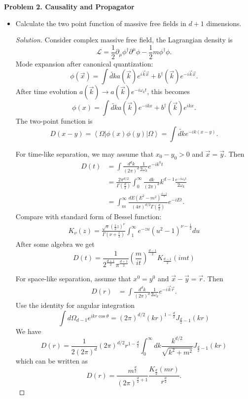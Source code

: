 \textbf{Problem 2. Causality and Propagator}
\begin{itemize}
	\item Calculate the two point function of massive free fields in $d+1$ dimensions.

\begin{proof}[Solution]
	Consider complex massive free field, the Lagrangian density is
	\[
		\mathcal{L} = \frac{1}{2} \partial_ \mu \phi ^\dag \partial^ \mu \phi - \frac{1}{2} m \phi^\dag \phi
	.\] 
	Mode expansion after canonical quantization:
	\[
		\phi(\vec{x} ) = \int \tilde{dk} a(\vec{k} ) e^{i \vec{k}  \vec{x} } + b^{\dag} (\vec{k} ) e^{- i \vec{k} \vec{x} }
	.\] 
	After time evolution $a(\vec{k} ) \to a(\vec{k} ) e^{- i \omega_k t}$, this becomes
	\[
		\phi(x) = \int \tilde{dk} a(\vec{k} ) e^{- i k x} + b^{\dag} (\vec{k} ) e^{i k x}
	.\] 
	The two-point function is
	\[
		D(x - y) = \left\langle \Omega \right| \phi(x) \phi(y) \left| \Omega \right\rangle = \int \tilde{dk} e^{- i k(x - y)}
	.\] 

	For time-like separation, we may assume that $x_0 - y_0 > 0$ and $\vec{x}  = \vec{y} $. Then
	\begin{align*}
		D(t)
		&= \int \frac{d^d k}{(2 \pi)^d} \frac{1}{2 \omega_k} e^{- i k^0 t} \\
		&= \frac{2 \pi^{d / 2}}{\Gamma(\frac{d}{2})} \int_0^\infty  \frac{d k}{(2 \pi)^d} k^{d - 1} \frac{e^{- i \omega_k t}}{2 \omega_k} \\
		&= \int _m^\infty \frac{dE (E^2 - m^2)^{\frac{d - 2}{2}}}{(4 \pi)^{d / 2} \Gamma(\frac{d}{2})} e^{- i E t}
	.\end{align*}
	Compare with standard form of Bessel function:
	\begin{align*}
K_\nu(z)=\frac{\sqrt{\pi}\left(\frac{1}{2} z\right)^\nu}{\Gamma\left(\nu+\frac{1}{2}\right)} \int_1^{\infty} e^{-z u}\left(u^2-1\right)^{\nu-\frac{1}{2}} d u
\end{align*}
After some algebra we get
\[
D(t)=\frac{1}{2^{\frac{d+1}{2}} \pi^{\frac{d+1}{2}}}\left(\frac{m}{i t}\right)^{\frac{d-1}{2}} K_{\frac{d-1}{2}}(i m t)
\]

For space-like separation, assume that $x^0 = y^0 $ and  $\vec{x}  - \vec{y} = \vec{r} $. Then
\begin{align*}
	D(r) &= \int \frac{d^d k}{(2 \pi)^d} \frac{1}{2 \omega_k}e^{- i \vec{k} \vec{r} }
.\end{align*}
Use the identity for angular integration
\[
\int d \Omega_{d-1} e^{i k r \cos \theta}=(2 \pi)^{d / 2}(k r)^{1-\frac{d}{2}} J_{\frac{d}{2}-1}(k r)
\]
We have
\[
D(r)=\frac{1}{2(2 \pi)^d}(2 \pi)^{d / 2} r^{1-\frac{d}{2}} \int_0^{\infty} d k \frac{k^{d / 2}}{\sqrt{k^2+m^2}} J_{\frac{d}{2}-1}(k r)
\]
which can be written as
\[
	D(r) = \frac{m^{\frac{d}{2}}}{(2 \pi)^{\frac{d}{2}+1}} \frac{K_{\frac{d}{2}}(m r)}{r^{\frac{d}{2}}}
.\] 
\end{proof}


\end{itemize}
